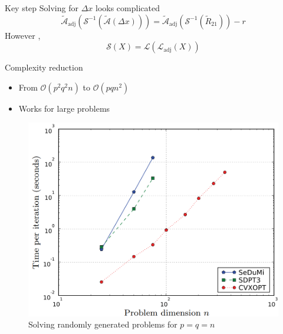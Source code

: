 \documentclass{beamer}
\newcommand{\mA}{\mathcal{A}}
\begin{document}
\begin{frame}{Key step}
Solving for $ \Delta x $ looks complicated
	\begin{equation}
		\tilde{\mA}_\text{adj}(\mathcal{S}^{-1}(\tilde{\mA}(\Delta x)))=\tilde{\mA}_\text{adj}(\mathcal{S}^{-1}(\tilde{R}_{21})) -r
	\end{equation}
However ,
\begin{equation}
	\mathcal{S}(X) = \mathcal{L}(\mathcal{L}_\text{adj}(X))
\end{equation}
\end{frame}
\begin{frame}{Complexity reduction}
	\begin{itemize}
		\item From $ \mathcal{O}(p^2q^2n) $ to $ \mathcal{O}(pqn^2) $
		\item Works for large problems
	\end{itemize}
	 \begin{figure}[h]
		\includegraphics[width=0.55\linewidth]{Fig_1}
		\caption{Solving randomly generated problems for $p=q=n $}
		\label{}
	\end{figure}
\end{frame}
\end{document}
